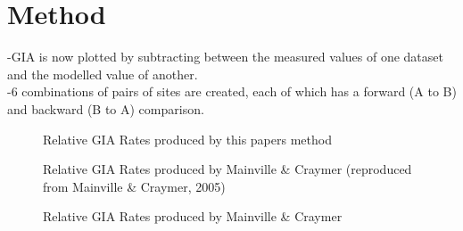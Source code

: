 \documentclass{article}
\begin{document}
\section[2]{Method}
-GIA is now plotted by subtracting between the measured values of one dataset and the modelled value of another.\\
-6 combinations of pairs of sites are created, each of which has a forward (A to B) and backward (B to A) comparison.\\
\newpage
%

\newpage
\begin{figure}[h]
	\caption{Relative GIA Rates produced by this papers method}
	\label{fig:myGIARates}
\end{figure}
\newpage
\begin{figure}[h]
	\caption{Relative GIA Rates produced by Mainville \& Craymer (reproduced from Mainville \& Craymer, 2005)}
	\label{fig:craymerGIARatesBigPlot}
\end{figure}
\newpage
\begin{figure}[h]
	\caption{Relative GIA Rates produced by Mainville \& Craymer}
	\label{fig:craymerGIARates}
\end{figure}
\end{document}

